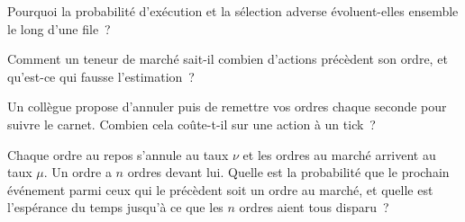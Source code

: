 \begin{interviewq}\label{iq:hf:queue-reactive-models-and-large-tick-assets:3}
Pourquoi la probabilité d'exécution et la sélection adverse évoluent-elles ensemble le long d'une file~?
\end{interviewq}

\begin{interviewq}\label{iq:hf:queue-reactive-models-and-large-tick-assets:4}
Comment un teneur de marché sait-il combien d'actions précèdent son ordre, et qu'est-ce qui fausse l'estimation~?
\end{interviewq}

\begin{interviewq}\label{iq:hf:queue-reactive-models-and-large-tick-assets:5}
Un collègue propose d'annuler puis de remettre vos ordres chaque seconde pour suivre le carnet. Combien cela coûte-t-il sur une action à un tick~?
\end{interviewq}

\begin{interviewq}\label{iq:hf:queue-reactive-models-and-large-tick-assets:6}
Chaque ordre au repos s'annule au taux $\nu$ et les ordres au marché arrivent au taux $\mu$. Un ordre a $n$ ordres devant lui. Quelle est la probabilité que
le prochain événement parmi ceux qui le précèdent soit un ordre au marché, et quelle est l'espérance du temps jusqu'à ce que les $n$ ordres aient tous disparu~?
\end{interviewq}
